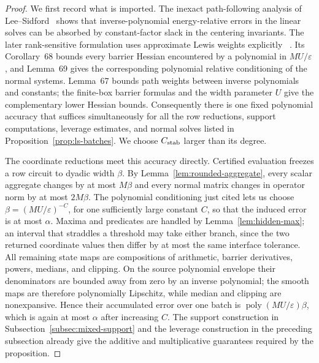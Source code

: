 \documentclass[11pt]{article}
\theoremstyle{definition}
\newcommand{\eps}{\varepsilon}
\newcommand{\poly}{\operatorname{poly}}
\begin{document}
\begin{proof}
We first record what is imported.  The inexact path-following analysis of
Lee--Sidford~\cite[Section~8, especially Theorem~28]{LeeSidfordPathII}
shows that inverse-polynomial energy-relative errors in the linear solves can
be absorbed by constant-factor slack in the centering invariants.  The later
rank-sensitive formulation uses approximate Lewis weights explicitly
~\cite[Theorems~39--40]{LeeSidford2020}.  Its Corollary~68 bounds every
barrier Hessian encountered by a polynomial in $MU/\eps$, and Lemma~69 gives
the corresponding polynomial relative conditioning of the normal systems.
Lemma~67 bounds path weights between inverse polynomials and constants; the
finite-box barrier formulas and the width parameter $U$ give the complementary
lower Hessian bounds.
Consequently there is one fixed polynomial accuracy that suffices
simultaneously for all the row reductions, support computations, leverage
estimates, and normal solves listed in
Proposition~\ref{prop:ls-batches}.  We choose $C_{\rm stab}$ larger than its
degree.

The coordinate reductions meet this accuracy directly.  Certified evaluation
freezes a row circuit to dyadic width $\beta$.  By
Lemma~\ref{lem:rounded-aggregate}, every scalar aggregate changes by at most
$M\beta$ and every normal matrix changes in operator norm by at most
$2M\beta$.  The polynomial conditioning just cited lets us choose
$\beta=(MU/\eps)^{-C}$, for one sufficiently large constant $C$, so that the
induced error is at most $\alpha$.  Maxima and predicates are handled by
Lemma~\ref{lem:hidden-max}; an interval that straddles a threshold may take
either branch, since the two returned coordinate values then differ by at
most the same interface tolerance.  All remaining state maps are compositions
of arithmetic, barrier derivatives, powers, medians, and clipping.  On the
source polynomial envelope their denominators are bounded away from zero by
an inverse polynomial; the smooth maps are therefore polynomially Lipschitz,
while median and clipping are nonexpansive.  Hence their accumulated error
over one batch is $\poly(MU/\eps)\beta$, which is again at most $\alpha$ after
increasing $C$.  The support construction in
Subsection~\ref{subsec:mixed-support} and the leverage construction in the
preceding subsection already give the additive and multiplicative guarantees
required by the proposition.


\end{proof}
\end{document}
